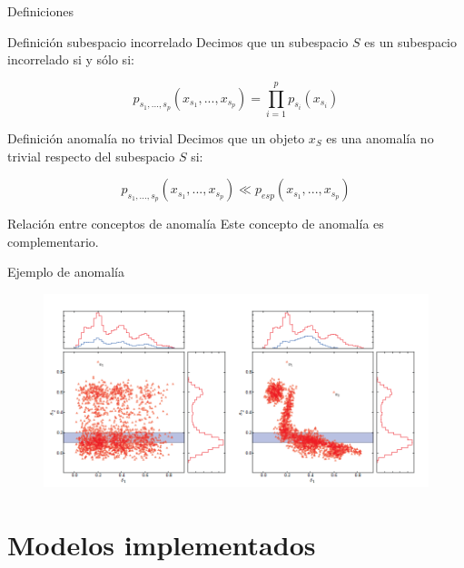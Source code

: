 \documentclass[10pt]{beamer}
\begin{document}
\begin{frame}[fragile]{Definiciones}
\vspace{10px}
\pause
{}

\begin{block}{Definición subespacio incorrelado}
	Decimos que un subespacio $S$ es un subespacio incorrelado si y sólo si:
	
	$$p_{s_1 , ... , s_p}(x_{s_1} , ... , {x_{s_p}}) = \prod_{i=1}^{p}p_{s_i}(x_{s_i})$$
\end{block}

\pause

\begin{block}{Definición anomalía no trivial}
	Decimos que un objeto $x_S$ es una anomalía no trivial respecto del subespacio $S$ si:
	
	$$p_{s_1 , ... , s_p}(x_{s_1} , ... , x_{s_p})\ll p_{esp}(x_{s_1} , ... , x_{s_p})$$
\end{block}

\pause

\begin{alertblock}{Relación entre conceptos de anomalía}
	Este concepto de anomalía es complementario.
\end{alertblock}

\end{frame}

\begin{frame}[fragile]{Ejemplo de anomalía}
\vspace{10px}
\pause
{}

\begin{figure}
	\centering
	\includegraphics[scale=0.5]{Imagenes/ejemplo_anomalia_probabilidad}
\end{figure}

\end{frame}

\section{Modelos implementados}
\end{document}

